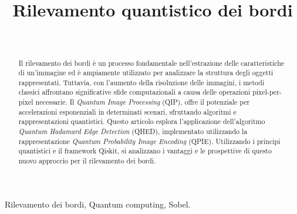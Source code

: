 \documentclass[journal]{IEEEtran}
\begin{document}
\title{Rilevamento quantistico dei bordi}

\author{
\\

}

\maketitle

\begin{abstract}
	Il rilevamento dei bordi è un processo fondamentale nell'estrazione delle caratteristiche di un'immagine ed è ampiamente utilizzato per analizzare la struttura degli oggetti rappresentati. Tuttavia, con l'aumento della risoluzione delle immagini, i metodi classici affrontano significative sfide computazionali a causa delle operazioni pixel-per-pixel necessarie. Il \emph{Quantum Image Processing} (QIP), offre il potenziale per accelerazioni esponenziali in determinati scenari, sfruttando algoritmi e rappresentazioni quantistici. Questo articolo esplora l'applicazione dell'algoritmo \emph{Quantum Hadamard Edge Detection} (QHED), implementato utilizzando la rappresentazione \emph{Quantum Probability Image Encoding} (QPIE). Utilizzando i principi quantistici e il framework Qiskit, si analizzano i vantaggi e le prospettive di questo nuovo approccio per il rilevamento dei bordi.
\end{abstract}

\begin{IEEEkeywords}
Rilevamento dei bordi, Quantum computing, Sobel.
\end{IEEEkeywords}





\end{document}
